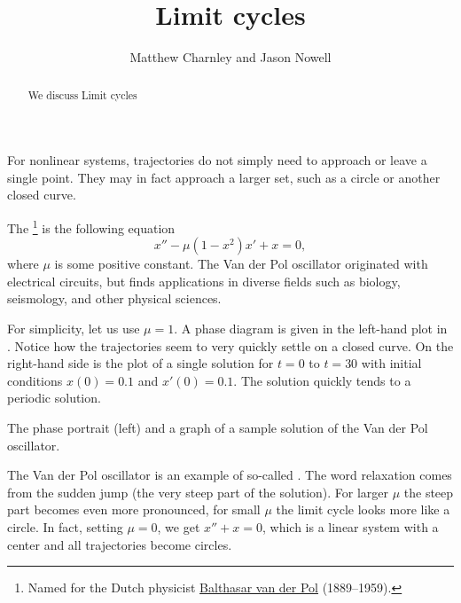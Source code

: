\documentclass{ximera}
\title{Limit cycles}
\author{Matthew Charnley and Jason Nowell}
\begin{document}
\begin{abstract}
    We discuss Limit cycles
\end{abstract}
\maketitle

\label{limitcycles:section}



For nonlinear systems, trajectories do not simply need to approach or leave a single point.  They may in fact approach a larger set, such as a circle or another closed curve.

\begin{example}
    The \emph{}%
    \footnote{Named for the Dutch physicist \href{https://en.wikipedia.org/wiki/Balthasar_van_der_Pol}{Balthasar van der Pol} (1889--1959).} is the following equation
    \begin{equation*}
        x''-\mu(1-x^2) x' + x = 0,
    \end{equation*}
    where $\mu$ is some positive constant.  The Van der Pol oscillator originated with electrical circuits, but finds applications in diverse fields such as biology, seismology, and other physical sciences.
    
    For simplicity, let us use $\mu = 1$.  A phase diagram is given in the left-hand plot in .  Notice how the trajectories seem to very quickly settle on a closed curve.  On the right-hand side is the plot of a single solution for $t=0$ to $t=30$ with initial conditions $x(0) = 0.1$ and $x'(0) = 0.1$.  The solution quickly tends to a periodic solution.
    \begin{myfig}
        \capstart
        \caption{The phase portrait (left) and a graph of a sample solution of the Van der Pol oscillator.\label{fig:nlin-van-der-fig}}
    \end{myfig}
    
    The Van der Pol oscillator is an example of so-called \emph{}.  The word relaxation comes from the sudden jump (the very steep part of the solution). For larger $\mu$ the steep part becomes even more pronounced, for small $\mu$ the limit cycle looks more like a circle.  In fact, setting $\mu = 0$, we get $x''+x=0$, which is a linear system with a center and all trajectories become circles.
\end{example}
\end{document}
